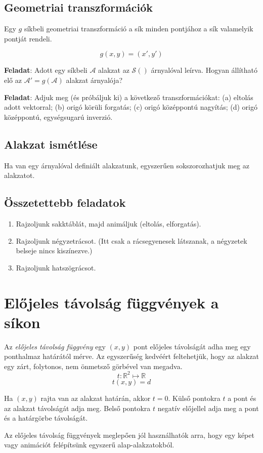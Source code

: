 \subsection{Geometriai transzformációk}

Egy $g$ síkbeli geometriai transzformáció a sík minden pontjához a sík valamelyik pontját rendeli.

$$g(x, y) = (x', y')$$

\textbf{Feladat}: Adott egy síkbeli $\mathcal{A}$ alakzat az $\mathcal{S}()$ árnyalóval leírva. Hogyan állítható elő
az $\mathcal{A}' = g(\mathcal{A})$ alakzat árnyalója?

\textbf{Feladat}: Adjuk meg (és próbáljuk ki) a következő transzformációkat:
(a) eltolás adott vektorral;
(b) origó körüli forgatás;
(c) origó középpontú nagyítás;
(d) origó középpontú, egységsugarú inverzió.


\subsection{Alakzat ismétlése}

Ha van egy árnyalóval definiált alakzatunk, egyszerűen sokszorozhatjuk meg az alakzatot.

\subsection{Összetettebb feladatok}

\begin{enumerate}
  \item Rajzoljunk sakktáblát, majd animáljuk (eltolás, elforgatás).
  \item Rajzoljunk négyzetrácsot. (Itt csak a rácsegyenesek látszanak, a négyzetek belseje nincs kiszínezve.)
  \item Rajzoljunk hatszögrácsot.
\end{enumerate}

\section{Előjeles távolság függvények a síkon}

\begin{tcolorbox}[title=Előjeles távolság függvény (signed distance function)]
  Az \emph{előjeles távolság függvény} egy $(x,y)$ pont előjeles távolságát adha meg egy ponthalmaz határától mérve.
  Az egyszerűség kedvéért feltehetjük, hogy az alakzat egy zárt, folytonos, nem önmetsző görbével van megadva.
  $$ t: \mathbb{R}^2 \mapsto \mathbb{R}$$
  $$ t(x, y) = d$$

  Ha $(x,y)$ rajta van az alakzat határán, akkor $t = 0$. Külső pontokra $t$ a pont és az alakzat távolságát adja meg.
  Belső pontokra $t$ negatív előjellel adja meg a pont és a határgörbe távolságát.
  
  Az előjeles távolság függvények meglepően jól használhatók arra, hogy egy képet vagy animációt felépítsünk egyszerű
  alap-alakzatokból.
  \end{tcolorbox}

